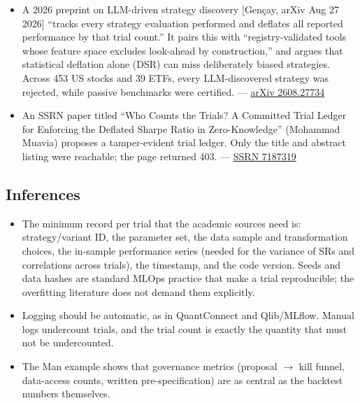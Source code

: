 \documentclass{article}
\begin{document}
\begin{itemize}
\item A 2026 preprint on LLM-driven strategy discovery [Gençay, arXiv Aug 27 2026] ``tracks every strategy evaluation performed and deflates all reported performance by that trial count.'' It pairs this with ``registry-validated tools whose feature space excludes look-ahead by construction,'' and argues that statistical deflation alone (DSR) can miss deliberately biased strategies. Across 453 US stocks and 39 ETFs, every LLM-discovered strategy was rejected, while passive benchmarks were certified. --- \href{https://arxiv.org/abs/2608.27734}{arXiv 2608.27734}

\item An SSRN paper titled ``Who Counts the Trials? A Committed Trial Ledger for Enforcing the Deflated Sharpe Ratio in Zero-Knowledge'' (Mohammad Muavia) proposes a tamper-evident trial ledger. Only the title and abstract listing were reachable; the page returned 403. --- \href{https://papers.ssrn.com/sol3/papers.cfm?abstract_id=7187319}{SSRN 7187319}

\end{itemize}

\subsection{Inferences}

\begin{itemize}

\item The minimum record per trial that the academic sources need is: strategy/\allowbreak{}variant ID, the parameter set, the data sample and transformation choices, the in-sample performance series (needed for the variance of SRs and correlations across trials), the timestamp, and the code version. Seeds and data hashes are standard MLOps practice that make a trial reproducible; the overfitting literature does not demand them explicitly.

\item Logging should be automatic, as in QuantConnect and Qlib/\allowbreak{}MLflow. Manual logs undercount trials, and the trial count is exactly the quantity that must not be undercounted.

\item The Man example shows that governance metrics (proposal \ensuremath{\rightarrow} kill funnel, data-access counts, written pre-specification) are as central as the backtest numbers themselves.

\end{itemize}
\end{document}
